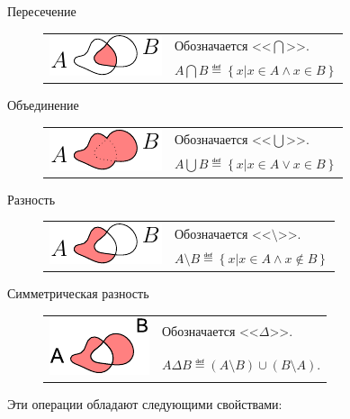 \begin{description}
	\item[Пересечение]
		\begin{tabular}{ll}
			\multirow{2}{*}{\includegraphics{graph/set-op-intersection}}
				& Обозначается <<$\bigcap$>>. \\
				& $A\bigcap B\eqdef\left\{x\vert x\in A \land x\in B\right\}$
		\end{tabular}
	\item[Объединение]
		\begin{tabular}{ll}
			\multirow{2}{*}{\includegraphics{graph/set-op-union}}
				& Обозначается <<$\bigcup$>>. \\
				& $A\bigcup B\eqdef\left\{x\vert x\in A \lor  x\in B\right\}$
		\end{tabular}
	\item[Разность]
		\begin{tabular}{ll}
			\multirow{2}{*}{\includegraphics{graph/set-op-difference}}
				& Обозначается <<$\setminus$>>. \\
				& $A\setminus B\eqdef\left\{x\vert x\in A \land x\notin B\right\}$
		\end{tabular}
	\item[Симметрическая разность]
		\begin{tabular}{ll}
			\multirow{2}{*}{\includegraphics{graph/set-op-simmdifference}}
				& Обозначается <<$\Delta$>>. \\
				& $A\Delta B\eqdef(A\setminus B)\cup(B\setminus A)$.
		\end{tabular}
\end{description}

Эти операции обладают следующими свойствами:

